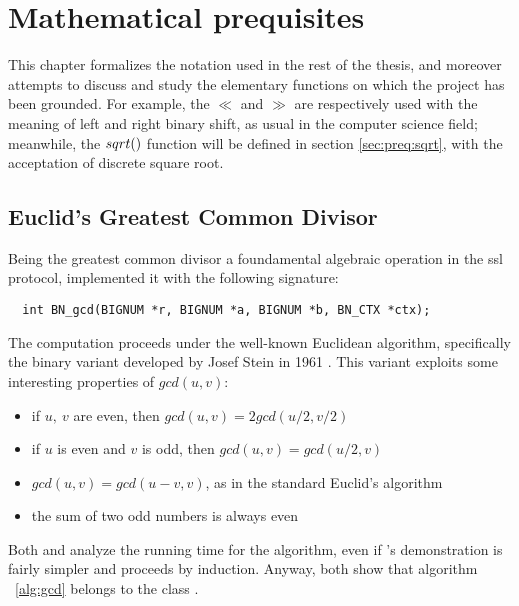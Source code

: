 \chapter{Mathematical prequisites \label{chap:preq}}

This chapter formalizes the notation used in the rest of the thesis, and
moreover attempts to discuss and study the elementary functions on which the
project has been grounded. For example, the $\ll$ and $\gg$ are respectively
used with the meaning of left and right binary shift, as usual in the computer
science field; meanwhile, the $\dsqrt$ function will be defined in section
\ref{sec:preq:sqrt}, with the acceptation of discrete square root.


\section{Euclid's Greatest Common Divisor}

Being the greatest common divisor a foundamental algebraic operation in the ssl
protocol, \openssl implemented it with the following signature:

\begin{verbatim}
  int BN_gcd(BIGNUM *r, BIGNUM *a, BIGNUM *b, BN_CTX *ctx);
\end{verbatim}

The computation proceeds under the well-known Euclidean algorithm, specifically
the binary variant developed by Josef Stein in 1961 \cite{AOCPv2}. This variant
exploits some interesting properties of $gcd(u, v)$:

\begin{itemize}
  \setlength{\itemsep}{1pt}
  \setlength{\parskip}{0pt}
  \setlength{\parsep}{0pt}
\item if $u,\ v$ are even, then $gcd(u, v) = 2gcd(u/2, v/2)$
\item if $u$ is even and $v$ is odd, then $gcd(u, v) = gcd(u/2, v)$
\item  $gcd(u, v) = gcd(u-v, v)$, as in the standard Euclid's algorithm
\item the sum of two odd numbers is always even
\end{itemize}

Both \cite{AOCPv2} and \cite{MITalg} analyze the running time for the algorithm,
even if \cite{MITalg}'s demonstration is fairly simpler and proceeds %
by induction.
Anyway, both show that algorithm ~\ref{alg:gcd} belongs to the class
.

